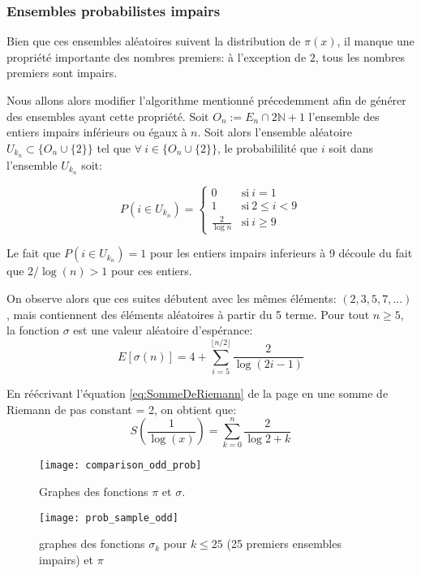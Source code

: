 \documentclass[../main.tex]{report}
\begin{document}
    \label{sec:odd_prob}
\subsubsection{Ensembles probabilistes impairs}
Bien que ces ensembles aléatoires suivent la distribution de $\pi(x)$, il manque une propriété importante des nombres premiers: à l'exception de $2$, tous les nombres premiers sont impairs.

Nous allons alors modifier l'algorithme mentionné précedemment afin de générer des ensembles ayant cette propriété. 
Soit $O_n := E_n \cap 2 \mathbb{N} +1$ l'ensemble des entiers impairs inférieurs ou égaux à $n$. 
Soit alors l'ensemble aléatoire 
$U_{k_n} \subset \{O_n \cup \{2\}\}$
tel que $\forall~i \in \{O_n \cup \{2\}\}$, le probabililité que $i$ soit dans l'ensemble $U_{k_n}$ soit:

\[
P(i \in U_{k_n}) = 
\left\{ 
    \begin{array}{cl}
         0 & \mbox{si}~i = 1 \\
         1 & \mbox{si}~ 2 \leq i < 9 \\
         \frac{2}{\log n} & \mbox{si}~i \geq 9
    \end{array}
\right.
\]

Le fait que $P(i \in U_{k_n}) = 1$ pour les entiers impairs inferieurs à 9 découle du fait que $2/\log(n) > 1$ pour ces entiers.

On observe alors que ces suites débutent avec les mêmes éléments: $ (2,3,5,7,...) $, mais contiennent des éléments aléatoires à partir du 5 terme. 
Pour tout $n \geq 5$, la fonction $\sigma$ est une valeur aléatoire d'espérance: 
\[
E[\sigma(n)] = 
4 + \sum_{i=5}^{\lfloor{n/2}\rfloor} \frac{2}{\log (2i-1)}
\]

En réécrivant l'équation \ref{eq:SommeDeRiemann} de la page \pageref{eq:SommeDeRiemann} en une somme de Riemann de pas constant = 2, on obtient que:
\[
S(\frac{1}{\log(x)}) = \sum_{k=0}^{n}\frac{2}{\log 2+k}
\]


\begin{figure}[H]
\centering
\texttt{[image: comparison\_odd\_prob]}
\caption{Graphes des fonctions $\pi$ et $\sigma$.}
\label{fig:comparison_sigma_prob}
\end{figure}

\begin{figure}[H]
	\centering
	\texttt{[image: prob\_sample\_odd]}
	\caption{graphes des fonctions $\sigma_k$ pour $k \leq 25$ (25 premiers ensembles impairs) et $\pi$}
	\label{fig:prob_sample_odd}
\end{figure}
\end{document}
